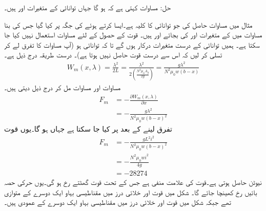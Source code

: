 حل:\quad
مساوات   کہتی ہے کہ  ہو گا جہاں توانائی کے متغیرات   اور  ہیں۔

مثال  میں  مساوات  حاصل کی جو توانائی کا کلیہ ہے۔ایسا کرتے ہوئے    کی  جگہ   پر کیا گیا جس کی بنا مساوات  میں   کے متغیرات  اور  کی بجائے    اور  ہیں۔  قوت کے حصول کے لئے  مساوات  استعمال نہیں کیا جا سکتا ہے۔ ہمیں  توانائی کے درست متغیرات درکار ہوں گے تا کہ توانائی  ہو (آپ مساوات  کا تفرق لے کر تسلی کر لیں کہ اس سے درست قوت حاصل نہیں ہوتا ہے)۔ درست طریقہ درج ذیل ہے۔
\begin{align}\label{مساوات_تبادلہ_درست_متغیرات}
W_m(x,\lambda)=\frac{\lambda^2}{2 L}=\frac{\lambda^2}{2 \left(\frac{N^2 \mu_0 A_g}{2 g} \right)}=\frac{ g \lambda^2}{N^2 \mu_0 w (b-x)}
\end{align}
مساوات  اور مساوات  مل کر درج ذیل دیتی ہیں۔
\begin{align*}
F_m&=-\frac{\partial W_m(x,\lambda)}{\partial x}\\
&=-\frac{g \lambda^2}{N^2 \mu_0 w (b-x)^2}
\end{align*}
تفرق لینے کے بعد  پر کیا جا سکتا ہے جہاں   ہو گا۔یوں قوت
\begin{align*}
F_m&=-\frac{g L^2 i^2}{N^2 \mu_0 w (b-x)^2}\\
&=-\frac{N^2 \mu_0 w i^2}{4 g}\\
&=\num{-28274}
\end{align*}
نیوٹن حاصل ہوتی ہے۔قوت کی علامت منفی ہے جس کے تحت قوت   گھٹتے  رخ ہو گی۔یوں حرکی حصہ بائیں رخ کھینچا جائے گا۔ شکل  میں قوت اور خلائی درز میں مقناطیسی بہاو ایک دوسرے کے متوازی تھے جبکہ شکل  میں قوت اور خلائی درز میں مقناطیسی بہاو ایک دوسرے کے عمودی ہیں۔ 

